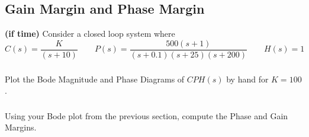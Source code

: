 \documentclass{article}	%
\begin{document}
%
%
%
%
%
%
%
%
%
%
%
%
%
%
%
%
%
%




\subsection{Gain Margin and Phase Margin}
{\bf (if time)}  Consider a closed loop system where
\[
C(s) = \frac{K}{(s+10)} \qquad P(s) = \frac{500(s+1)}{(s+0.1)(s+25)(s+200)} \qquad H(s) = 1
\]


\subsubsection{}  Plot the Bode Magnitude and Phase Diagrams of $CPH(s)$ by hand for $K=100$.

%
%
%
\subsubsection{}   Using your Bode plot from the previous section, compute the Phase and Gain Margins.
\end{document}
